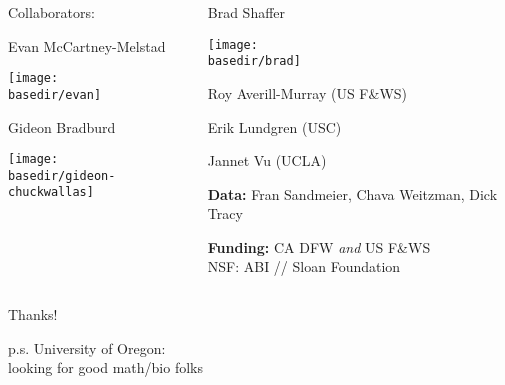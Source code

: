 \documentclass{beamer}
\newcommand{\basedir}{files}
\begin{document}

\begin{frame}{}

  \begin{columns}[c]
    \begin{column}{.4\textwidth}
      \begin{center}
        {\struct Collaborators:}

          {Evan McCartney-Melstad}

          \texttt{[image: \\basedir/evan]}

      {Gideon Bradburd}

          \texttt{[image: \\basedir/gideon-chuckwallas]}

      \end{center}
    \end{column}
    \begin{column}{.6\textwidth}

        \vspace{-2em}
      {Brad Shaffer}

        \texttt{[image: \\basedir/brad]}

        Roy Averill-Murray (US F\&WS)

        Erik Lundgren (USC)
      \vspace{0.5em}

        Jannet Vu (UCLA)
      \vspace{0.5em}

      \textbf{Data:}
      Fran Sandmeier, Chava Weitzman, Dick Tracy
      \vspace{0.5em}

      \textbf{Funding:}
        CA DFW \textit{and} US F\&WS \\
      NSF: ABI // 
      Sloan Foundation

    \end{column}
  \end{columns}

\end{frame}

\begin{frame}{ }

    \centering
    \vfill

    \Large Thanks!

    \vfill

    p.s. University of Oregon: \\
    looking for good math/bio folks

\end{frame}
\end{document}
